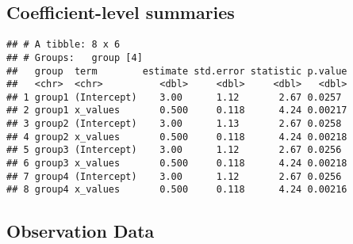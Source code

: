\documentclass[]{book}
\newenvironment{Shaded}{\begin{snugshade}}{\end{snugshade}}
\newcommand{\KeywordTok}[1]{\textcolor[rgb]{0.13,0.29,0.53}{\textbf{#1}}}
\newcommand{\NormalTok}[1]{#1}
\newcommand{\OperatorTok}[1]{\textcolor[rgb]{0.81,0.36,0.00}{\textbf{#1}}}
\newcommand{\StringTok}[1]{\textcolor[rgb]{0.31,0.60,0.02}{#1}}
\theoremstyle{definition}
\theoremstyle{definition}
\theoremstyle{definition}
\theoremstyle{remark}
\begin{document}
\hypertarget{coefficient-level-summaries}{%
\subsection{Coefficient-level
summaries}\label{coefficient-level-summaries}}

\begin{Shaded}
\end{Shaded}

\begin{verbatim}
## # A tibble: 8 x 6
## # Groups:   group [4]
##   group  term        estimate std.error statistic p.value
##   <chr>  <chr>          <dbl>     <dbl>     <dbl>   <dbl>
## 1 group1 (Intercept)    3.00      1.12       2.67 0.0257 
## 2 group1 x_values       0.500     0.118      4.24 0.00217
## 3 group2 (Intercept)    3.00      1.13       2.67 0.0258 
## 4 group2 x_values       0.500     0.118      4.24 0.00218
## 5 group3 (Intercept)    3.00      1.12       2.67 0.0256 
## 6 group3 x_values       0.500     0.118      4.24 0.00218
## 7 group4 (Intercept)    3.00      1.12       2.67 0.0256 
## 8 group4 x_values       0.500     0.118      4.24 0.00216
\end{verbatim}

\hypertarget{observation-data}{%
\subsection{Observation Data}\label{observation-data}}

\begin{Shaded}
\end{Shaded}
\end{document}
